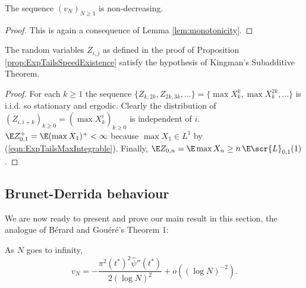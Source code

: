 \begin{proposition}\label{prop:increasing_speed}
The sequence $(v_N)_{N \geq 1}$ is non-decreasing. 
\end{proposition}
\begin{proof}
This is again a consequence of Lemma \ref{lem:monotonicity}. 
\end{proof}


\begin{lemma}\label{lem:ExpTailsKingmanHolds}
The random variables $Z_{i,j}$ as defined in the proof of Proposition \ref{prop:ExpTailsSpeedExistence} satisfy the hypothesis of Kingman's Subadditive Theorem. 
\end{lemma}

\begin{proof}
For each $k \geq 1$ the sequence $\{Z_{k, 2k}, Z_{2k, 3k}, ...\} = \{\max X^k_k, \max X^{2k}_k, ... \}$ is i.i.d. so stationary and ergodic. Clearly the distribution of $(Z_{i, i + k})_{k \geq 0} = (\max X^i_k)_{k \geq 0}$ is independent of $i$. $\E Z^+_{0,1} = \E (\max X_1)^+ < \infty$ because $\max X_1 \in L^1$ by (\ref{eqn:ExpTailsMaxIntegrable}). Finally, $\E Z_{0, n} = \E \max X_n \geq n\, \E \scr{L}_{0,1}(1)$. 
\end{proof}











\subsection{Brunet-Derrida behaviour}\label{sec:ExpTails_BrunDer}

We are now ready to present and prove our main result in this section, the analogue of Bérard and Gouéré's Theorem 1:
\begin{theorem}\label{thm:ExpTails_BrunDer}
As $N$ goes to infinity, 
\begin{equation*}
v_N = - \frac{\pi^2 (t^*)^2 \widehat{\psi}''(t^*)}{2 (\log N)^2} + o((\log N)^{-2}). 
\end{equation*}
\end{theorem}

